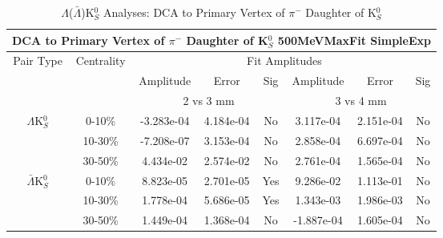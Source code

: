 \documentclass[../AnalysisNoteJBuxton.tex]{subfiles}
\begin{document}
\begin{table}
 \centering
 \begin{tabular}{|c|c|c|c|c||c|c|c|}
  \multicolumn{8}{c}{DCA to Primary Vertex of $\pi^{-}$ Daughter of K$^{0}_{S}$ 500MeVMaxFit SimpleExp} \\
  \hline
  \multirow{3}{*}{Pair Type} & \multirow{3}{*}{Centrality} & \multicolumn{6}{c|}{Fit Amplitudes} \\
  \cline{3-8}
   & & Amplitude & Error & Sig & Amplitude & Error & Sig \\  
  \cline{3-8}
   & & \multicolumn{3}{c||}{2 vs 3 mm} & \multicolumn{3}{c|}{3 vs 4 mm} \\  
  \hline  
  \multirow{3}{*}{$\Lambda$K$^{0}_{S}$}  
   &  0-10\% & -3.283e-04 & 4.184e-04 & No & 3.117e-04 & 2.151e-04 & No \\
   & 10-30\% & -7.208e-07 & 3.153e-04 & No & 2.858e-04 & 6.697e-04 & No \\
   & 30-50\% & 4.434e-02 & 2.574e-02 & No & 2.761e-04 & 1.565e-04 & No \\
  \hline  
  \multirow{3}{*}{$\bar{\Lambda}$K$^{0}_{S}$}  
   &  0-10\% & 8.823e-05 & 2.701e-05 & Yes & 9.286e-02 & 1.113e-01 & No \\
   & 10-30\% & 1.778e-04 & 5.686e-05 & Yes & 1.343e-03 & 1.986e-03 & No \\
   & 30-50\% & 1.449e-04 & 1.368e-04 & No & -1.887e-04 & 1.605e-04 & No \\
  \hline
 \end{tabular}
 \caption{$\Lambda$($\bar{\Lambda}$)K$^{0}_{S}$ Analyses: DCA to Primary Vertex of $\pi^{-}$ Daughter of K$^{0}_{S}$}
 \label{tab:DcaToPrimVertexNegPionDaughtOfK0LamK0_500MeVMaxFit_SimpleExp}
\end{table}






\clearpage
\end{document}
